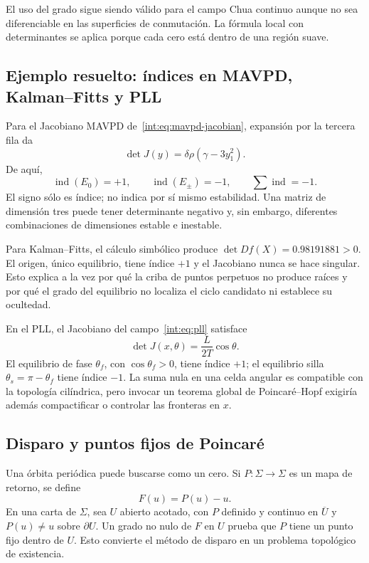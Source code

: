 El uso del grado sigue siendo válido para el campo Chua continuo aunque no sea
diferenciable en las superficies de conmutación. La fórmula local con
determinantes se aplica porque cada cero está dentro de una región suave.

\subsection{Ejemplo resuelto: índices en MAVPD, Kalman--Fitts y PLL}

Para el Jacobiano MAVPD de~\eqref{int:eq:mavpd-jacobian}, expansión por la
tercera fila da
\begin{equation}
 \det J(y)=\delta\rho(\gamma-3y_1^2).
 \label{geo:eq:mavpd-jacobian-det}
\end{equation}
De aquí,
\begin{equation}
 \operatorname{ind}(E_0)=+1,\qquad
 \operatorname{ind}(E_\pm)=-1,\qquad
 \sum\operatorname{ind}=-1.
 \label{geo:eq:mavpd-indices}
\end{equation}
El signo sólo es índice; no indica por sí mismo estabilidad. Una matriz de
dimensión tres puede tener determinante negativo y, sin embargo, diferentes
combinaciones de dimensiones estable e inestable.

Para Kalman--Fitts, el cálculo simbólico produce
\(\det Df(X)=0.98191881>0\). El origen, único equilibrio, tiene índice \(+1\)
y el Jacobiano nunca se hace singular. Esto explica a la vez por qué la criba
de puntos perpetuos no produce raíces y por qué el grado del equilibrio no
localiza el ciclo candidato ni establece su ocultedad.

En el PLL, el Jacobiano del campo~\eqref{int:eq:pll} satisface
\begin{equation}
 \det J(x,\theta)=\frac{L}{2T}\cos\theta.
 \label{geo:eq:pll-jacobian-det}
\end{equation}
El equilibrio de fase \(\theta_f\), con \(\cos\theta_f>0\), tiene índice
\(+1\); el equilibrio silla \(\theta_s=\pi-\theta_f\) tiene índice \(-1\).
La suma nula en una celda angular es compatible con la topología cilíndrica,
pero invocar un teorema global de Poincaré--Hopf exigiría además compactificar
o controlar las fronteras en \(x\).

\subsection{Disparo y puntos fijos de Poincaré}

Una órbita periódica puede buscarse como un cero. Si \(P:\Sigma\to\Sigma\) es
un mapa de retorno, se define
\begin{equation}
 F(u)=P(u)-u.
 \label{geo:eq:fixed-point-residual}
\end{equation}
En una carta de \(\Sigma\), sea \(U\) abierto acotado, con \(P\) definido
y continuo en \(\overline U\) y \(P(u)\ne u\) sobre \(\partial U\).
Un grado no nulo de \(F\) en \(U\) prueba que \(P\) tiene un
punto fijo dentro de \(U\). Esto convierte el método de disparo en un problema
topológico de existencia.

